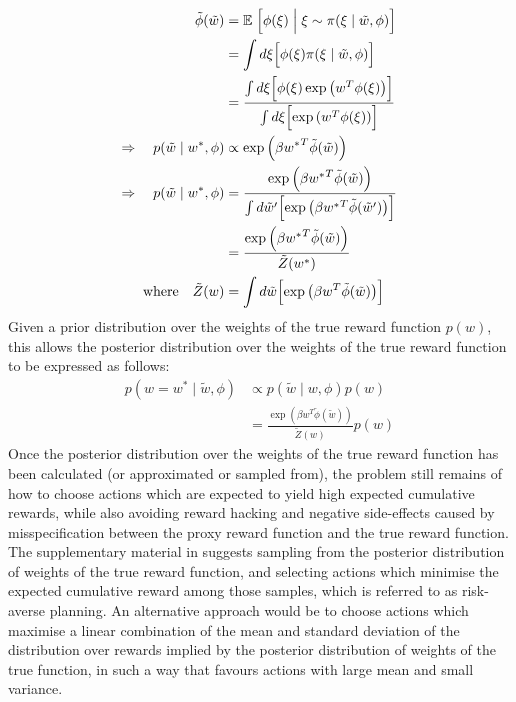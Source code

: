\begin{align*}
    \tilde{\phi}(\tilde{w}) &= \mathbb{E}\left. \Bigl[ \phi(\xi) \;\middle\vert\; \xi \sim \pi(\xi\mid \tilde{w}, \phi) \Bigr] \right. \\
    &= \int{ d\xi\Bigl[ \phi(\xi) \pi(\xi\mid \tilde{w}, \phi) \Bigr]} \\
    &= \frac{\int{ d\xi\Bigl[ \phi(\xi) \exp\left( w^T \phi(\xi) \right) \Bigr]}}{\int{ d\xi\Bigl[ \exp\left( w^T \phi(\xi) \right) \Bigr]}} \\
    \Rightarrow \quad p(\tilde{w} \mid w^*, \phi) &\propto \exp\left( \beta {w^*}^T \tilde{\phi}(\tilde{w}) \right) \\
    \Rightarrow \quad p(\tilde{w} \mid w^*, \phi) &= \frac{\exp\left( \beta {w^*}^T \tilde{\phi}(\tilde{w}) \right)}{\int{ d\tilde{w}' \Bigl[ \exp\left( \beta {w^*}^T \tilde{\phi}(\tilde{w}') \right) \Bigr]}} \\
    &= \frac{\exp\left( \beta {w^*}^T \tilde{\phi}(\tilde{w}) \right)}{\tilde{Z}(w^*)} \\
    \text{where} \quad \tilde{Z}(w) &= \int{ d\tilde{w} \Bigl[ \exp\left( \beta {w}^T \tilde{\phi}(\tilde{w}) \right) \Bigr]}
\end{align*}
Given a prior distribution over the weights of the true reward function $p(w)$, this allows the posterior distribution over the weights of the true reward function to be expressed as follows:
\begin{align*}
    p(w=w^*\mid \tilde{w}, \phi) &\propto p(\tilde{w} \mid w, \phi) p(w) \\
    &= \frac{\exp\left( \beta {w}^T \tilde{\phi}(\tilde{w}) \right)}{\tilde{Z}(w)} p(w) \label{eq:reward posterior}
\end{align*}
Once the posterior distribution over the weights of the true reward function has been calculated (or approximated or sampled from), the problem still remains of how to choose actions which are expected to yield high expected cumulative rewards, while also avoiding reward hacking and negative side-effects caused by misspecification between the proxy reward function and the true reward function. The supplementary material in \cite{hadfield2017inverse} suggests sampling from the posterior distribution of weights of the true reward function, and selecting actions which minimise the expected cumulative reward among those samples, which is referred to as risk-averse planning. An alternative approach would be to choose actions which maximise a linear combination of the mean and standard deviation of the distribution over rewards implied by the posterior distribution of weights of the true function, in such a way that favours actions with large mean and small variance.
